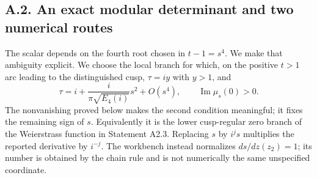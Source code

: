 \subsection{A.2. An exact modular determinant and two numerical routes}

The scalar depends on the fourth root chosen in $t-1=s^4$.  We make
that ambiguity explicit.  We choose the local branch for which, on
the positive $t>1$ arc leading to the distinguished cusp,
$\tau=iy$ with $y>1$, and
\begin{equation}\label{eq:A-s-branch}
\tau=i+\frac{i}{\pi\sqrt{E_4(i)}}s^2+O(s^4),\qquad
\operatorname{Im}\mu_s(0)>0.
\end{equation}
The nonvanishing proved below makes the second condition meaningful;
it fixes the remaining sign of $s$.  Equivalently it is the lower
cusp-regular zero branch of the Weierstrass function in Statement A2.3.
Replacing $s$ by $i^js$ multiplies the reported derivative by $i^{-j}$.
The workbench instead normalizes $ds/dz(z_2)=1$; its number is obtained
by the chain rule and is not numerically the same unspecified coordinate.

